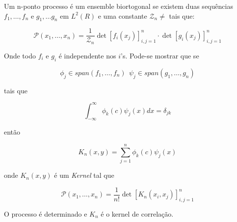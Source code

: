 Um n-ponto processo é um ensemble biortogonal se existem duas sequências $f_1, \dots, f_n$ e $g_1, \dots g_n$ em $L^2(R)$ e uma constante $\mathcal{Z}_n \neq $ tais que:

\[
	\mathcal{P}(x_1, \dots, x_n) = \frac{1}{\mathcal{Z}_n} \det{[f_i(x_j)]_{i,j=1}^{n}} \cdot \det{[g_i(x_j)]_{i,j=1}^{n}}
\]

Onde todo $f_i$ e $g_i$ é independente nos $i$'s. Pode-se mostrar que se

\[
	\phi_j \in span(f_1, \dots, f_n) \ \ \psi_j \in span(g_1, \dots, g_n)
\]

tais que 

\[
	\int_{-\infty}^{\infty} \phi_k(c) \psi_j(x) dx = \delta_{jk}
\]

então

\[
	K_n(x,y) = \sum_{j=1}^{n} \phi_k(c) \psi_j(x)
\]

onde $K_n(x, y)$ é um \textit{Kernel} tal que

\[
	\mathcal{P}(x_1, \dots, x_n) = \frac{1}{n!} \det{[K_n(x_i, x_j)]_{i,j=1}^{n}}
\]

O processo é determinado e $K_n$ é o kernel de correlação.